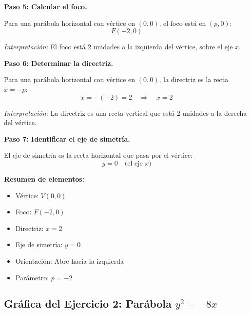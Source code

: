\documentclass[12pt,a4paper]{article}
\begin{document}
	\textbf{Paso 5: Calcular el foco.}

	Para una parábola horizontal con vértice en \((0,0)\), el foco está en \((p,0)\):
	\[
	\boxed{F(-2,0)}
	\]

	\emph{Interpretación:} El foco está 2 unidades a la izquierda del vértice, sobre el eje \(x\).

	\bigskip

	\textbf{Paso 6: Determinar la directriz.}

	Para una parábola horizontal con vértice en \((0,0)\), la directriz es la recta \(x=-p\):
	\[
	x=-(-2)=2 \quad\Rightarrow\quad \boxed{x=2}
	\]

	\emph{Interpretación:} La directriz es una recta vertical que está 2 unidades a la derecha del vértice.

	\bigskip

	\textbf{Paso 7: Identificar el eje de simetría.}

	El eje de simetría es la recta horizontal que pasa por el vértice:
	\[
	y=0 \quad\text{(el eje \(x\))}
	\]

	\bigskip

	\textbf{Resumen de elementos:}
	\begin{itemize}
		\item Vértice: \(V(0,0)\)
		\item Foco: \(F(-2,0)\)
		\item Directriz: \(x=2\)
		\item Eje de simetría: \(y=0\)
		\item Orientación: Abre hacia la izquierda
		\item Parámetro: \(p=-2\)
	\end{itemize}

	\subsection*{Gráfica del Ejercicio 2: Parábola \(y^2=-8x\)}
\end{document}
